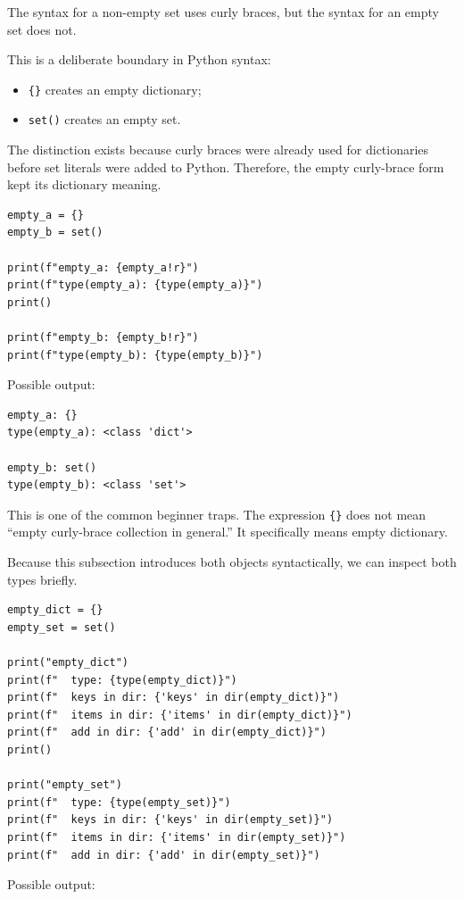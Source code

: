 The syntax for a non-empty set uses curly braces, but the syntax for an empty set does not.

This is a deliberate boundary in Python syntax:

\begin{itemize}
    \item \texttt{\{\}} creates an empty dictionary;
    \item \texttt{set()} creates an empty set.
\end{itemize}

The distinction exists because curly braces were already used for dictionaries before set literals were added to Python. Therefore, the empty curly-brace form kept its dictionary meaning.

\begin{verbatim}
empty_a = {}
empty_b = set()

print(f"empty_a: {empty_a!r}")
print(f"type(empty_a): {type(empty_a)}")
print()

print(f"empty_b: {empty_b!r}")
print(f"type(empty_b): {type(empty_b)}")
\end{verbatim}

Possible output:

\begin{verbatim}
empty_a: {}
type(empty_a): <class 'dict'>

empty_b: set()
type(empty_b): <class 'set'>
\end{verbatim}

This is one of the common beginner traps. The expression \texttt{\{\}} does not mean ``empty curly-brace collection in general.'' It specifically means empty dictionary.

Because this subsection introduces both objects syntactically, we can inspect both types briefly.

\begin{verbatim}
empty_dict = {}
empty_set = set()

print("empty_dict")
print(f"  type: {type(empty_dict)}")
print(f"  keys in dir: {'keys' in dir(empty_dict)}")
print(f"  items in dir: {'items' in dir(empty_dict)}")
print(f"  add in dir: {'add' in dir(empty_dict)}")
print()

print("empty_set")
print(f"  type: {type(empty_set)}")
print(f"  keys in dir: {'keys' in dir(empty_set)}")
print(f"  items in dir: {'items' in dir(empty_set)}")
print(f"  add in dir: {'add' in dir(empty_set)}")
\end{verbatim}

Possible output:

